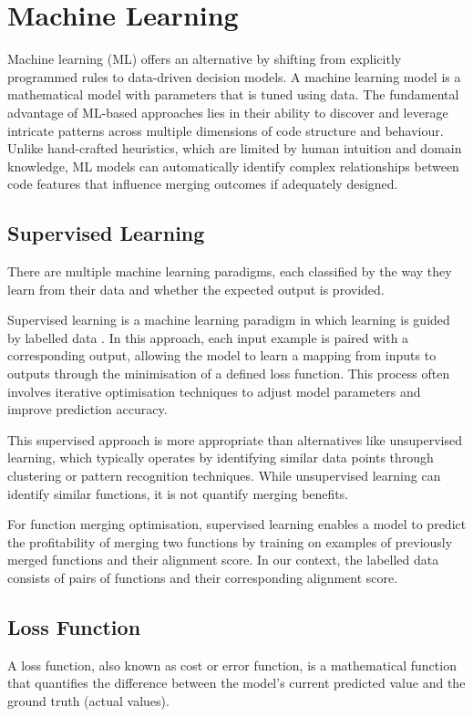 \section{Machine Learning} \label{ML}
Machine learning (ML) offers an alternative by shifting from explicitly programmed rules to data-driven decision models. A machine learning model is a mathematical model with parameters that is tuned using data. The fundamental advantage of ML-based approaches lies in their ability to discover and leverage intricate patterns across multiple dimensions of code structure and behaviour. Unlike hand-crafted heuristics, which are limited by human intuition and domain knowledge, ML models can automatically identify complex relationships between code features that influence merging outcomes if adequately designed.

\subsection{Supervised Learning}
There are multiple machine learning paradigms, each classified by the way they learn from their data and whether the expected output is provided.

Supervised learning is a machine learning paradigm in which learning is guided by labelled data \cite{MLParadigms} \cite{SupervisedLearningAndTrainingProcess}. In this approach, each input example is paired with a corresponding output, allowing the model to learn a mapping from inputs to outputs through the minimisation of a defined loss function. This process often involves iterative optimisation techniques to adjust model parameters and improve prediction accuracy. 

This supervised approach is more appropriate than alternatives like unsupervised learning, which typically operates by identifying similar data points through clustering or pattern recognition techniques. While unsupervised learning can identify similar functions, it is not quantify merging benefits.

For function merging optimisation, supervised learning enables a model to predict the profitability of merging two functions by training on examples of previously merged functions and their alignment score. In our context, the labelled data consists of pairs of functions and their corresponding alignment score.

\subsection{Loss Function} \label{ML:LossFunction}
A loss function, also known as cost or error function, is a mathematical function that quantifies the difference between the model's current predicted value and the ground truth (actual values).

